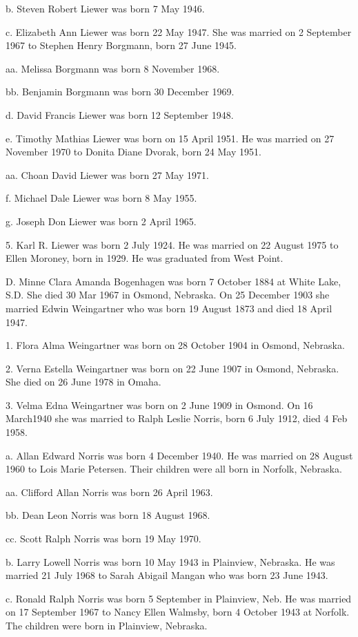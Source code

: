 \documentclass[a4paper]{article}
\begin{document}
b. Steven Robert Liewer was born 7 May 1946.

c. Elizabeth Ann Liewer was born 22 May 1947.  She was married on 2 September 1967 to Stephen Henry Borgmann, born 27 June 1945.

aa. Melissa Borgmann was born 8 November 1968.

bb. Benjamin Borgmann was born 30 December 1969.

d. David Francis Liewer was born 12 September 1948.

e. Timothy Mathias Liewer was born on 15 April  1951.  He was married on 27 November 1970 to Donita Diane Dvorak, born 24 May 1951.
 
aa. Choan David Liewer was born 27 May 1971.

f. Michael Dale Liewer was born 8 May 1955.

g. Joseph Don Liewer was born 2 April 1965.

5. Karl R. Liewer was born 2 July 1924.  He was married on 22 August 1975 to Ellen Moroney, born in 1929.  He was graduated from West Point.    

D. Minne Clara Amanda Bogenhagen was born 7 October 1884 at White Lake, S.D.  She died 30 Mar 1967 in Osmond, Nebraska.  On 25 December 1903 she married Edwin Weingartner who was born 19 August 1873 and died 18 April 1947.

1. Flora Alma Weingartner was born on 28 October 1904 in Osmond, Nebraska.

2. Verna Estella Weingartner was born on 22 June 1907 in Osmond, Nebraska. She died on 26 June 1978 in Omaha.

3. Velma Edna Weingartner was born on 2 June 1909 in Osmond.  On 16 March1940 she was married to Ralph Leslie Norris, born 6 July 1912, died 4 Feb 1958.

a. Allan Edward Norris was born 4 December 1940.  He was married on 28 August 1960 to Lois Marie Petersen.  Their children were all born in Norfolk, Nebraska.

aa. Clifford Allan Norris was born 26 April 1963.

bb. Dean Leon Norris was born 18 August 1968.

cc. Scott Ralph Norris was born 19 May 1970.

b. Larry Lowell Norris was  born 10 May 1943 in Plainview, Nebraska. He was married 21 July 1968 to Sarah Abigail Mangan who was born 23 June 1943.

c. Ronald Ralph Norris was born 5 September in Plainview, Neb. He was married on 17 September 1967 to Nancy Ellen Walmsby, born 4 October 1943 at Norfolk.  The children were born in Plainview, Nebraska.
\end{document}
